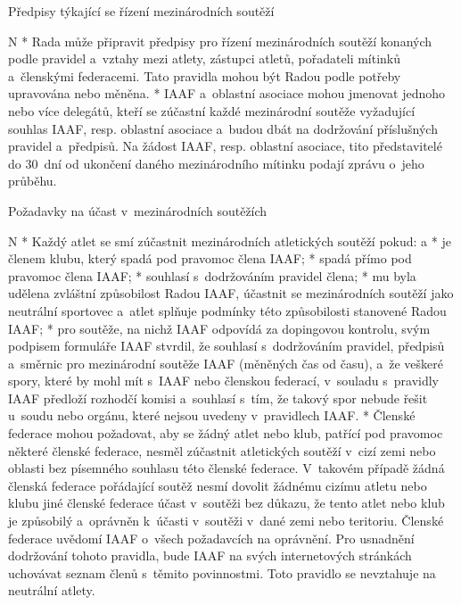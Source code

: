 \secc Předpisy týkající se řízení mezinárodních soutěží

\begitems \style N
* Rada může připravit předpisy pro řízení mezinárodních soutěží konaných podle pravidel a~vztahy mezi atlety, zástupci atletů, pořadateli mítinků a~členskými federacemi. Tato pravidla mohou být Radou podle potřeby upravována nebo měněna.
* IAAF a~oblastní asociace mohou jmenovat jednoho nebo více delegátů, kteří se zúčastní každé mezinárodní soutěže vyžadující souhlas IAAF, resp. oblastní asociace a~budou dbát na dodržování příslušných pravidel a~předpisů. Na žádost IAAF, resp. oblastní asociace, tito představitelé do 30~dní od ukončení daného mezinárodního mítinku podají zprávu o~jeho průběhu.
\enditems

\secc Požadavky na účast v~mezinárodních soutěžích

\begitems \style N
* Každý atlet se smí zúčastnit mezinárodních atletických soutěží pokud:
  \begitems \style a
  * je členem klubu, který spadá pod pravomoc člena IAAF;
  * spadá přímo pod pravomoc člena IAAF;
  * souhlasí s~dodržováním pravidel člena;
  * mu byla udělena zvláštní způsobilost Radou IAAF, účastnit  se mezinárodních soutěží jako neutrální sportovec a~atlet splňuje podmínky této způsobilosti stanovené Radou IAAF;
  * pro soutěže, na nichž IAAF odpovídá za dopingovou kontrolu, svým podpisem formuláře IAAF stvrdil, že souhlasí s~dodržováním pravidel, předpisů a~směrnic pro mezinárodní soutěže IAAF (měněných čas od času), a~že veškeré spory, které by mohl mít s~IAAF nebo členskou federací, v~souladu s~pravidly IAAF předloží rozhodčí komisi a~souhlasí s~tím, že takový spor nebude řešit u~soudu nebo orgánu, které nejsou uvedeny v~pravidlech IAAF.
  \enditems
* Členské federace mohou požadovat, aby se žádný atlet nebo klub, patřící pod pravomoc některé členské federace, nesměl zúčastnit atletických soutěží v~cizí zemi nebo oblasti bez písemného souhlasu této členské federace. V~takovém případě žádná členská federace pořádající soutěž nesmí dovolit žádnému cizímu atletu nebo klubu jiné členské federace účast v~soutěži bez důkazu, že tento atlet nebo klub je způsobilý a~oprávněn k~účasti v~soutěži v~dané zemi nebo teritoriu. Členské federace uvědomí IAAF o~všech požadavcích na oprávnění. Pro usnadnění dodržování tohoto pravidla, bude IAAF na svých internetových stránkách uchovávat seznam členů s~těmito povinnostmi. Toto pravidlo se nevztahuje na neutrální atlety.
